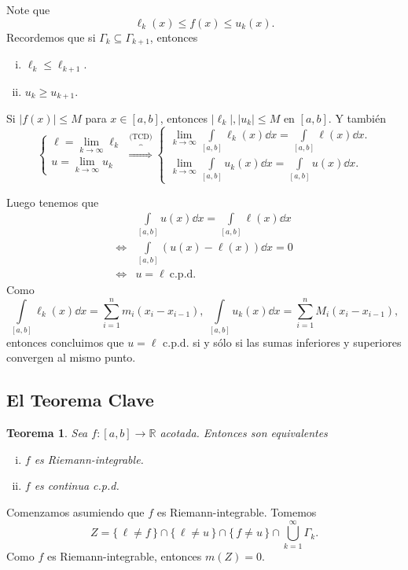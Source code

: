 \documentclass[utf8]{beamer}
\theoremstyle{plain}
\newtheorem{Th}{Teorema}               %
\theoremstyle{definition}
\theoremstyle{remark}
\numberwithin{equation}{section}
\newcommand{\Ga}{\Gamma}                %
\newcommand{\bR}{\mathbb{R}}    %
\newcommand{\bonj}[1]{\left\lbrack#1\right\rbrack}
\newcommand{\set}[1]{\{\,#1\,\}}    %
\renewcommand{\geq}{\geqslant}          %
\renewcommand{\l}{\ell}                   %
\renewcommand{\leq}{\leqslant}          %
\newcommand{\To}{\Rightarrow}
\newcommand{\suck}{_{k=1}^\infty} %
\renewcommand{\.}{\Cdot}                %
\begin{document}
\begin{frame}
  Note que 
  $$\l_k(x)\leq f(x)\leq u_k(x).$$
  Recordemos que si $\Ga_k\subseteq\Ga_{k+1}$, entonces 
  \begin{enumerate}[(i)]
    \item $\l_k\leq\l_{k+1}$.
    \item $u_k\geq u_{k+1}$.
  \end{enumerate}
  Si $|f(x)|\leq M$ para $x\in[a,b]$, entonces $|\l_k|,|u_k|\leq M$ en $[a,b]$. Y también
  $$
  \begin{cases}\displaystyle
    \l=\lim_{k\to\infty}\l_k\\
    \displaystyle u=\lim_{k\to\infty}u_k
  \end{cases}
  \overbrace{\To}^{\text{(TCD)}}
  \begin{cases}\displaystyle
    \lim_{k\to\infty}\int\limits_{\bonj{a,b}}\l_k(x)\dd x=\int\limits_{\bonj{a,b}}\l(x)\dd x.\\
    \displaystyle\lim_{k\to\infty}\int\limits_{\bonj{a,b}}u_k(x)\dd x=\int\limits_{\bonj{a,b}}u(x)\dd x.
  \end{cases}
  $$
\end{frame}

\begin{frame}
  Luego tenemos que
  \begin{align*}
    &\int\limits_{\bonj{a,b}}u(x)\dd x=\int\limits_{\bonj{a,b}}\l(x)\dd x\\
    \iff&\int\limits_{\bonj{a,b}}(u(x)-\l(x))\dd x=0\\
    \iff&u=\l\ \text{c.p.d.}
  \end{align*}
  Como 
  $$\int\limits_{\bonj{a,b}}\l_k(x)\dd x=\sum_{i=1}^{n}m_i(x_i-x_{i-1}),\ \int\limits_{\bonj{a,b}}u_k(x)\dd x=\sum_{i=1}^{n}M_i(x_i-x_{i-1}),$$
  entonces concluimos que $u=\l$ c.p.d. si y sólo si las sumas inferiores y superiores convergen al mismo punto.
\end{frame}

\subsection{El Teorema Clave}
\begin{frame}
  \begin{Th}\label{th:riemannIffContAE}
    Sea $f:[a,b]\to\bR$ acotada. Entonces son equivalentes
    \begin{enumerate}[(i)]
      \item $f$ es Riemann-integrable.
      \item $f$ es continua c.p.d.
    \end{enumerate}
  \end{Th}
  Comenzamos asumiendo que $f$ es Riemann-integrable. Tomemos 
  $$Z=\set{\l\neq f}\cap\set{\l\neq u}\cap\set{f\neq u}\cap\bigcup\suck\Ga_k.$$
  Como $f$ es Riemann-integrable, entonces $m(Z)=0$. 
\end{frame}
\end{document}
